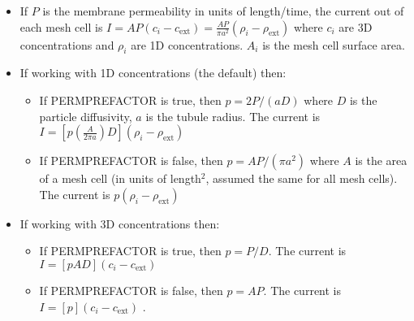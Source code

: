 \documentclass[12pt]{article}
\begin{document}
\begin{itemize}
\begin{itemize}
	\item If $P$ is the membrane permeability in units of length/time, the current out of each mesh cell is $I = AP (c_i - c_\text{ext}) = \frac{AP}{\pi a^2} (\rho_i - \rho_\text{ext})$ where $c_i$ are 3D concentrations and $\rho_i$ are 1D concentrations. $A_i$ is the mesh cell surface area.
	\item If working with 1D concentrations (the default) then:
	\begin{itemize}
	\item If PERMPREFACTOR is true, then $p = 2P/(aD)$ where $D$ is the particle diffusivity, $a$ is the tubule radius. The current is $I = [p (\frac{A}{2\pi a}) D](\rho_i - \rho_\text{ext})$ 
	\item If PERMPREFACTOR is false, then $p = A P/(\pi a^2)$ where $A$ is the area of a mesh cell (in units of length$^2$, assumed the same for all mesh cells). The current is $p(\rho_i - \rho_\text{ext})$
	\end{itemize}
	\item If working with 3D concentrations then:
	\begin{itemize}
		\item If PERMPREFACTOR is true, then $p = P/D$. The current is $I = [p A D](c_i - c_\text{ext})$ 
		\item If PERMPREFACTOR is false, then $p = A P$. The current is $I = [p](c_i - c_\text{ext})$  .		
	\end{itemize}
	
\end{itemize}


\end{itemize}
\end{document}
